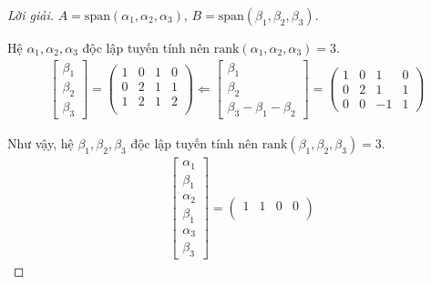 \documentclass[class=linear-algebra,crop=false]{standalone}
\begin{document}
\begin{proof}[Lời giải]$A = \text{span}(\alpha_{1},\alpha_{2},\alpha_{3})$, $B = \text{span}(\beta_{1},\beta_{2},\beta_{3})$.
    \par Hệ $\alpha_{1}, \alpha_{2}, \alpha_{3}$ độc lập tuyến tính nên $\text{rank}(\alpha_{1}, \alpha_{2}, \alpha_{3}) = 3$.
    \begin{align*}
        \begin{bmatrix}
            \beta_{1} \\
            \beta_{2} \\
            \beta_{3}
        \end{bmatrix}=
        \begin{pmatrix}
            1 & 0 & 1 & 0 \\
            0 & 2 & 1 & 1 \\
            1 & 2 & 1 & 2 \\
        \end{pmatrix}
        \Longleftarrow
        \begin{bmatrix}
            \beta_{1} \\
            \beta_{2} \\
            \beta_{3} - \beta_{1} - \beta_{2}
        \end{bmatrix}=
        \begin{pmatrix}
            1 & 0 & 1  & 0 \\
            0 & 2 & 1  & 1 \\
            0 & 0 & -1 & 1
        \end{pmatrix}
    \end{align*}
    \par Như vậy, hệ $\beta_{1}, \beta_{2}, \beta_{3}$ độc lập tuyến tính nên $\text{rank}(\beta_{1}, \beta_{2}, \beta_{3}) = 3$.
    \begin{align*}
                        & \begin{bmatrix}
                              \alpha_{1} \\
                              \beta_{1}  \\
                              \alpha_{2} \\
                              \beta_{1}  \\
                              \alpha_{3} \\
                              \beta_{3}
                          \end{bmatrix}=
        \begin{pmatrix}
            1 & 1 & 0 & 0 \\

\end{pmatrix}
\end{align*}
\end{proof}
\end{document}
